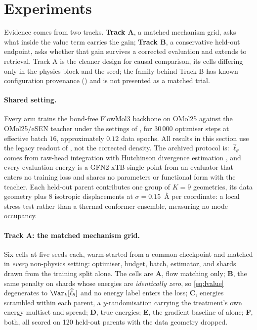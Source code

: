 \section{Experiments}
\label{sec:setup}
\label{sec:protocol}
\label{sec:metrics}
\label{sec:experiments}

Evidence comes from two tracks. \textbf{Track A}, a matched mechanism grid, asks what inside the
value term carries the gain; \textbf{Track B}, a conservative held-out endpoint, asks whether that
gain survives a corrected evaluation and extends to retrieval. Track A is the cleaner design for
causal comparison, its cells differing only in the physics block and the seed; the family behind
Track B has known configuration provenance () and is not presented as a matched
trial.

\paragraph{Shared setting.} Every arm trains the bond-free FlowMol3 backbone \citep{flowmol3} on
OMol25 \citep{omol25} against the OMol25/eSEN teacher \citep{esen} under the settings of
, for $30\,000$ optimiser steps at effective batch $16$, approximately $0.12$ data
epochs. All results in this section use the legacy readout of , not the corrected density. The archived protocol is: $\widehat{\ell}_\theta$ comes from raw-head integration
with Hutchinson divergence estimation
\citep{ffjord,hutchinson}, and every evaluation energy is a GFN2-xTB single point \citep{gfn2xtb}
from an evaluator that enters no training loss and shares no parameters or functional form with the
teacher. Each held-out parent contributes one group of $K = 9$ geometries, its data geometry plus
$8$ isotropic displacements at $\sigma = 0.15$~\AA{} per coordinate: a local stress test rather than
a thermal conformer ensemble, measuring no mode occupancy.

\paragraph{Track A: the matched mechanism grid.} Six cells at five seeds each, warm-started from a
common checkpoint and matched in \emph{every} non-physics setting: optimiser, budget, batch,
estimator, and shards drawn from the training split alone. The cells are \textbf{A},
flow matching only; \textbf{B}, the same penalty on shards whose energies are \emph{identically
zero}, so \eqref{eq:lvalue} degenerates to $\Var_k[\widehat{\ell}_\theta]$ and no energy label enters the
loss; \textbf{C}, energies scrambled within each parent, a $y$-randomisation
\citep{ruecker2007yrandom} carrying the treatment's own energy multiset and spread; \textbf{D}, true
energies; \textbf{E}, the gradient baseline of  alone; \textbf{F}, both, all
scored on 120 held-out parents with the data geometry dropped.

